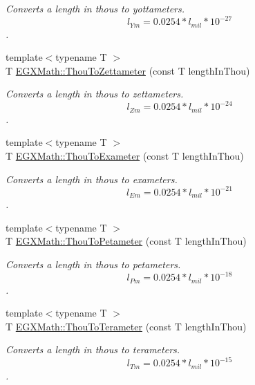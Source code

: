 \begin{DoxyCompactItemize}
\begin{DoxyCompactList}\small\item\em Converts a length in thous to yottameters. \[ l_{Ym}=0.0254 * l_{mil} * 10^{-27} \]. \end{DoxyCompactList}\item 
{\footnotesize template$<$typename T $>$ }\\T \mbox{\hyperlink{group___e_g_x_math-_conversions-_length_conversions-_imperial-_thou-_s_i_ga388e6005a2fec0fb3e52db46841eacef}{E\+G\+X\+Math\+::\+Thou\+To\+Zettameter}} (const T length\+In\+Thou)
\begin{DoxyCompactList}\small\item\em Converts a length in thous to zettameters. \[ l_{Zm}=0.0254 * l_{mil} * 10^{-24} \]. \end{DoxyCompactList}\item 
{\footnotesize template$<$typename T $>$ }\\T \mbox{\hyperlink{group___e_g_x_math-_conversions-_length_conversions-_imperial-_thou-_s_i_ga727138bc2a5fb18f959a675df44b6306}{E\+G\+X\+Math\+::\+Thou\+To\+Exameter}} (const T length\+In\+Thou)
\begin{DoxyCompactList}\small\item\em Converts a length in thous to exameters. \[ l_{Em}=0.0254 * l_{mil} * 10^{-21} \]. \end{DoxyCompactList}\item 
{\footnotesize template$<$typename T $>$ }\\T \mbox{\hyperlink{group___e_g_x_math-_conversions-_length_conversions-_imperial-_thou-_s_i_ga14912eb2003dcac47d530dfb90b90761}{E\+G\+X\+Math\+::\+Thou\+To\+Petameter}} (const T length\+In\+Thou)
\begin{DoxyCompactList}\small\item\em Converts a length in thous to petameters. \[ l_{Pm}=0.0254 * l_{mil} * 10^{-18} \]. \end{DoxyCompactList}\item 
{\footnotesize template$<$typename T $>$ }\\T \mbox{\hyperlink{group___e_g_x_math-_conversions-_length_conversions-_imperial-_thou-_s_i_ga166a46a29a2a25eab620f82c43240878}{E\+G\+X\+Math\+::\+Thou\+To\+Terameter}} (const T length\+In\+Thou)
\begin{DoxyCompactList}\small\item\em Converts a length in thous to terameters. \[ l_{Tm}=0.0254 * l_{mil} * 10^{-15} \]. \end{DoxyCompactList}\item 

\end{DoxyCompactItemize}

